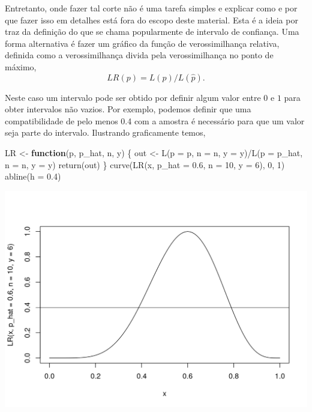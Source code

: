 \documentclass[
  10pt,
  a4paper]{book}
\newenvironment{Shaded}{\begin{snugshade}}{\end{snugshade}}
\newcommand{\AttributeTok}[1]{\textcolor[rgb]{0.77,0.63,0.00}{#1}}
\newcommand{\ControlFlowTok}[1]{\textcolor[rgb]{0.13,0.29,0.53}{\textbf{#1}}}
\newcommand{\DecValTok}[1]{\textcolor[rgb]{0.00,0.00,0.81}{#1}}
\newcommand{\FloatTok}[1]{\textcolor[rgb]{0.00,0.00,0.81}{#1}}
\newcommand{\FunctionTok}[1]{\textcolor[rgb]{0.00,0.00,0.00}{#1}}
\newcommand{\NormalTok}[1]{#1}
\newcommand{\OtherTok}[1]{\textcolor[rgb]{0.56,0.35,0.01}{#1}}
\newcommand{\SpecialCharTok}[1]{\textcolor[rgb]{0.00,0.00,0.00}{#1}}
\begin{document}
Entretanto, onde fazer tal corte não é uma tarefa simples e explicar como e por que fazer isso em detalhes está fora do escopo deste material. Esta é a ideia por traz da definição do que se chama popularmente de intervalo de confiança.
Uma forma alternativa é fazer um gráfico da função de verossimilhança relativa, definida como a verossimilhança divida pela verossimilhança no ponto de máximo,
\[
LR(p) = L(p)/L(\hat{p}).
\]

Neste caso um intervalo pode ser obtido por definir algum valor entre \(0\) e \(1\) para obter intervalos não vazios. Por exemplo, podemos definir que uma compatibilidade de pelo menos 0.4 com a amostra é necessário para que um valor seja parte do intervalo. Ilustrando graficamente temos,

\begin{Shaded}
\begin{Highlighting}[]
\NormalTok{LR }\OtherTok{\textless{}{-}} \ControlFlowTok{function}\NormalTok{(p, p\_hat, n, y) \{}
\NormalTok{  out }\OtherTok{\textless{}{-}} \FunctionTok{L}\NormalTok{(}\AttributeTok{p =}\NormalTok{ p, }\AttributeTok{n =}\NormalTok{ n, }\AttributeTok{y =}\NormalTok{ y)}\SpecialCharTok{/}\FunctionTok{L}\NormalTok{(}\AttributeTok{p =}\NormalTok{ p\_hat, }\AttributeTok{n =}\NormalTok{ n, }\AttributeTok{y =}\NormalTok{ y)}
  \FunctionTok{return}\NormalTok{(out)}
\NormalTok{\}}
\FunctionTok{curve}\NormalTok{(}\FunctionTok{LR}\NormalTok{(x, }\AttributeTok{p\_hat =} \FloatTok{0.6}\NormalTok{, }\AttributeTok{n =} \DecValTok{10}\NormalTok{, }\AttributeTok{y =} \DecValTok{6}\NormalTok{), }\DecValTok{0}\NormalTok{, }\DecValTok{1}\NormalTok{)}
\FunctionTok{abline}\NormalTok{(}\AttributeTok{h =} \FloatTok{0.4}\NormalTok{)}
\end{Highlighting}
\end{Shaded}

\begin{center}\includegraphics{figures/unnamed-chunk-379-1} \end{center}
\end{document}
